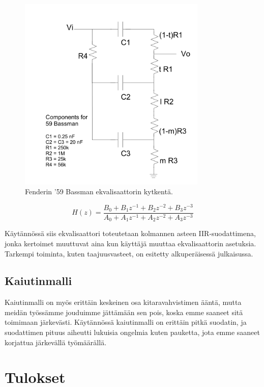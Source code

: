 \documentclass[11pt, a4paper, oneside]{article}
\begin{document}
\begin{figure}[h!]
\includegraphics[width=0.8\textwidth, center]{eq.png} \newline
\caption{Fenderin '59 Bassman ekvalisaattorin kytkentä. \cite{fender}}
\label{fig:eq}
\end{figure}

\begin{equation}
H(z)=\frac{B_0 + B_1 z^{-1} + B_2 z^{-2} + B_3 z^{-3} }{A_0 + A_1 z^{-1}  + A_2 z^{-2}  + A_3 z^{-3} }
\label{eq:eq} %
\end{equation} 

Käytännössä siis ekvalisaattori toteutetaan kolmannen asteen IIR-suodattimena, jonka kertoimet muuttuvat aina kun käyttäjä muuttaa ekvalisaattorin asetuksia. 
Tarkempi toiminta, kuten taajuusvasteet, on esitetty alkuperäisessä julkaisussa. \cite{fender}

 \subsection{Kaiutinmalli}
 
 Kaiutinmalli on myös erittäin keskeinen osa kitaravahvistimen ääntä, mutta meidän työssämme jouduimme jättämään sen pois, koska emme saaneet sitä toimimaan järkevästi. 
 Käytännössä kaiutinmalli on erittäin pitkä suodatin, ja suodattimen pituus aiheutti lukuisia ongelmia kuten pauketta, jota emme saaneet korjattua järkevällä työmäärällä.
 
\section{Tulokset}
\end{document}
